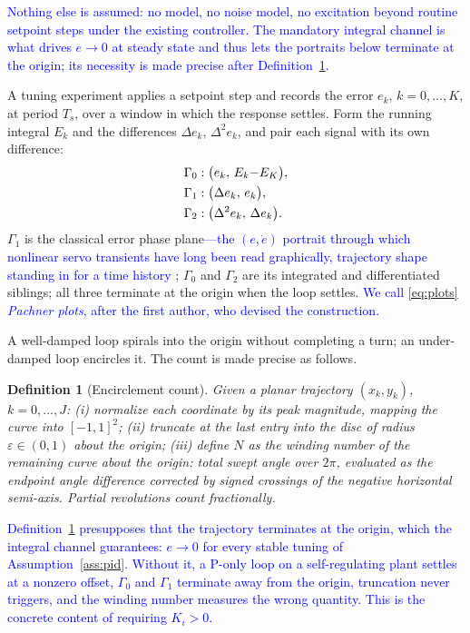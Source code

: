 \documentclass[final,3p,times,twocolumn]{elsarticle}
\newcommand{\rev}[1]{\textcolor{blue}{#1}}  %
\newcommand{\revc}[1]{\textcolor{blue}{#1}} %
\newcommand{\revf}[1]{\textcolor{blue}{#1}} %
\newtheorem{definition}{Definition}
\begin{document}
\rev{Nothing else is assumed: no model, no noise model, no excitation
beyond routine setpoint steps under the existing controller. The
mandatory integral channel is what drives $e \to 0$ at steady state and
thus lets the portraits below terminate at the origin; its necessity is
made precise after Definition~\ref{def:count}.}

A tuning experiment applies a setpoint step and
records the error $e_k$, $k = 0,\dots,K$, at period $T_s$, over a window
in which the response settles. Form the running integral $E_k$ and the
differences $\Delta e_k$, $\Delta^2 e_k$, and pair each signal with its
own difference:
\begin{align}
\Gamma_0&: \bigl(e_k,\, E_k{-}E_{K}\bigr), \notag\\
\Gamma_1&: \bigl(\Delta e_k,\, e_k\bigr), \notag\\
\Gamma_2&: \bigl(\Delta^2 e_k,\, \Delta e_k\bigr).
\label{eq:plots}
\end{align}
$\Gamma_1$ is the classical error phase plane\revf{---the
$(e,\dot e)$ portrait through which nonlinear servo transients have
long been read graphically, trajectory shape standing in for a time
history \cite{GrahamMcRuer1961}}; $\Gamma_0$ and
$\Gamma_2$ are its integrated and differentiated siblings; all three
terminate at the origin when the loop settles. \revc{We call
\eqref{eq:plots} \emph{Pachner plots}, after the first author, who
devised the construction.}

A well-damped loop spirals into the origin without completing a turn; an
under-damped loop encircles it. The count is made precise as follows.

\begin{definition}[Encirclement count]\label{def:count}
Given a planar trajectory $(x_k, y_k)$, $k = 0,\dots,J$:
(i) normalize each coordinate by its peak magnitude, mapping the curve
into $[-1,1]^2$;
(ii) truncate at the last entry into the disc of radius
$\varepsilon \in (0,1)$ about the origin;
(iii) define $N$ as the winding number of the remaining curve about the
origin: total swept angle over $2\pi$, evaluated as the endpoint angle
difference corrected by signed crossings of the negative horizontal
semi-axis. Partial revolutions count fractionally.
\end{definition}

\rev{Definition~\ref{def:count} presupposes that the trajectory
terminates at the origin, which the integral channel guarantees:
$e \to 0$ for every stable tuning of Assumption~\ref{ass:pid}. Without
it, a P-only loop on a self-regulating plant settles at a nonzero
offset, $\Gamma_0$ and $\Gamma_1$ terminate away from the origin,
truncation never triggers, and the winding number measures the wrong
quantity. This is the concrete content of requiring $K_i > 0$.}
\end{document}
